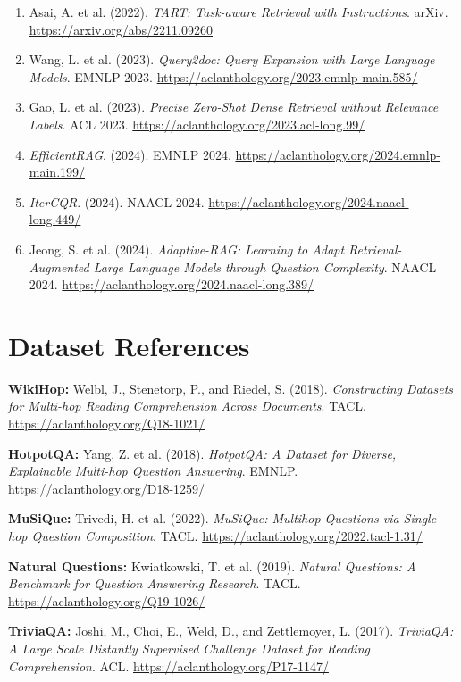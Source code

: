 \documentclass[11pt,a4paper]{article}
\begin{document}
\begin{enumerate}[leftmargin=1.6em]
\item Asai, A. et al. (2022).
\textit{TART: Task-aware Retrieval with Instructions}.
arXiv.
\url{https://arxiv.org/abs/2211.09260}

\item Wang, L. et al. (2023).
\textit{Query2doc: Query Expansion with Large Language Models}.
EMNLP 2023.
\url{https://aclanthology.org/2023.emnlp-main.585/}

\item Gao, L. et al. (2023).
\textit{Precise Zero-Shot Dense Retrieval without Relevance Labels}.
ACL 2023.
\url{https://aclanthology.org/2023.acl-long.99/}

\item \textit{EfficientRAG}. (2024).
EMNLP 2024.
\url{https://aclanthology.org/2024.emnlp-main.199/}

\item \textit{IterCQR}. (2024).
NAACL 2024.
\url{https://aclanthology.org/2024.naacl-long.449/}

\item Jeong, S. et al. (2024).
\textit{Adaptive-RAG: Learning to Adapt Retrieval-Augmented Large Language Models through Question Complexity}.
NAACL 2024.
\url{https://aclanthology.org/2024.naacl-long.389/}

\end{enumerate}

\section*{Dataset References}

\textbf{WikiHop:} Welbl, J., Stenetorp, P., and Riedel, S. (2018).
\textit{Constructing Datasets for Multi-hop Reading Comprehension Across Documents}.
TACL.
\url{https://aclanthology.org/Q18-1021/}

\textbf{HotpotQA:} Yang, Z. et al. (2018).
\textit{HotpotQA: A Dataset for Diverse, Explainable Multi-hop Question Answering}.
EMNLP.
\url{https://aclanthology.org/D18-1259/}

\textbf{MuSiQue:} Trivedi, H. et al. (2022).
\textit{MuSiQue: Multihop Questions via Single-hop Question Composition}.
TACL.
\url{https://aclanthology.org/2022.tacl-1.31/}

\textbf{Natural Questions:} Kwiatkowski, T. et al. (2019).
\textit{Natural Questions: A Benchmark for Question Answering Research}.
TACL.
\url{https://aclanthology.org/Q19-1026/}

\textbf{TriviaQA:} Joshi, M., Choi, E., Weld, D., and Zettlemoyer, L. (2017).
\textit{TriviaQA: A Large Scale Distantly Supervised Challenge Dataset for Reading Comprehension}.
ACL.
\url{https://aclanthology.org/P17-1147/}
\end{document}
